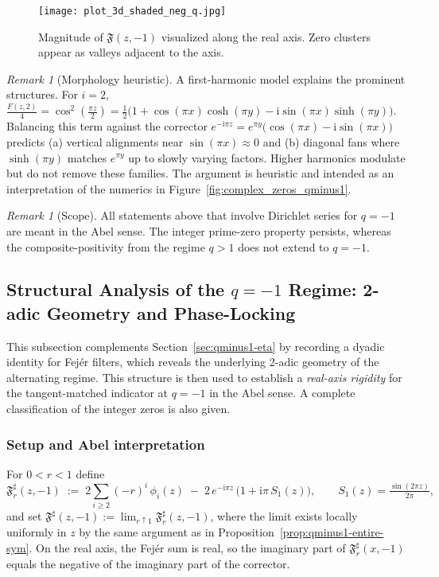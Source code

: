 \documentclass[11pt,a4paper]{amsart}
\newcommand{\ii}{\mathrm{i}}
\newcommand{\Fbase}{\mathfrak F}
\newcommand{\Fsharp}{\Fbase^{\sharp}}
\theoremstyle{plain}
\theoremstyle{definition}
\theoremstyle{remark}
\newtheorem{remark}[theorem]{Remark}
\begin{document}
\begin{figure}[!htbp]
\centering
\texttt{[image: plot\_3d\_shaded\_neg\_q.jpg]}
\caption{Magnitude of $\mathfrak{F}(z,-1)$ visualized along the real axis. Zero clusters appear as valleys adjacent to the axis.}
\label{fig:3d_real_axis_shaded_neg_q}
\end{figure}

\FloatBarrier

\begin{remark}[Morphology heuristic]\label{rem:qminus1-morphology}
A first-harmonic model explains the prominent structures. For $i=2$,
\(\tfrac{F(z,2)}{4}=\cos^2(\tfrac{\pi z}{2})
=\tfrac12\bigl(1+\cos(\pi x)\cosh(\pi y)-\ii \sin(\pi x)\sinh(\pi y)\bigr)\).
Balancing this term against the corrector $e^{-\ii\pi z}=e^{\pi y}\big(\cos(\pi x)-\ii\sin(\pi x)\big)$ predicts (a) vertical alignments near $\sin(\pi x)\approx0$ and (b) diagonal fans where $\sinh(\pi y)$ matches $e^{\pi y}$ up to slowly varying factors. Higher harmonics modulate but do not remove these families. The argument is heuristic and intended as an interpretation of the numerics in Figure~\ref{fig:complex_zeros_qminus1}.
\end{remark}

\begin{remark}[Scope]
All statements above that involve Dirichlet series for $q=-1$ are meant in the Abel sense. The integer prime-zero property persists, whereas the composite-positivity from the regime $q>1$ does not extend to $q=-1$.
\end{remark}


\subsection{Structural Analysis of the \texorpdfstring{$q=-1$}{q=-1} Regime: 2-adic Geometry and Phase-Locking}
\label{subsec:struct-qminus1}

This subsection complements Section~\ref{sec:qminus1-eta} by recording a dyadic identity for Fej\'er filters, which reveals the underlying 2-adic geometry of the alternating regime. This structure is then used to establish a \emph{real-axis rigidity} for the tangent-matched indicator at $q=-1$ in the Abel sense. A complete classification of the integer zeros is also given.

\subsubsection*{Setup and Abel interpretation}
For $0<r<1$ define
\[
\Fsharp_r(z,-1)\;:=\;2\sum_{i\ge2}(-r)^i\,\phi_i(z)\;-\;2\,e^{-\ii\pi z}\,\bigl(1+\ii\pi\,S_1(z)\bigr),
\qquad
S_1(z)=\tfrac{\sin(2\pi z)}{2\pi},
\]
and set $\Fsharp(z,-1):=\lim_{r\uparrow1}\Fsharp_r(z,-1)$, where the limit exists locally uniformly in $z$ by the same argument as in Proposition~\ref{prop:qminus1-entire-sym}. On the real axis, the Fej\'er sum is real, so the imaginary part of $\Fsharp_r(x,-1)$ equals the negative of the imaginary part of the corrector.
\end{document}
